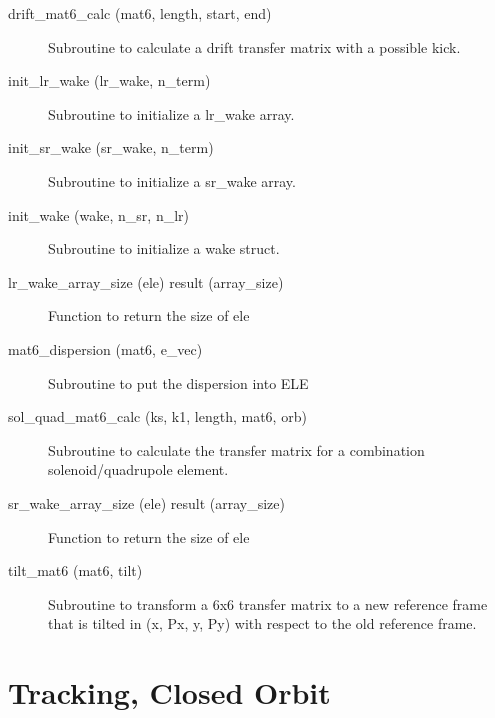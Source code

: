 \begin{description}

\item[drift\_mat6\_calc (mat6, length, start, end)] \Newline
Subroutine to calculate a drift transfer matrix with a possible kick. 

\item[init\_lr\_wake (lr\_wake, n\_term)] \Newline 
Subroutine to initialize a lr\_wake array.

\item[init\_sr\_wake (sr\_wake, n\_term)] \Newline 
Subroutine to initialize a sr\_wake array.

\item[init\_wake (wake, n\_sr, n\_lr)] \Newline 
Subroutine to initialize a wake struct.

\item[lr\_wake\_array\_size (ele) result (array\_size)] \Newline 
Function to return the size of ele%

\item[mat6\_dispersion (mat6, e\_vec)] \Newline
Subroutine to put the dispersion into ELE%

\item[sol\_quad\_mat6\_calc (ks, k1, length, mat6, orb)] \Newline
Subroutine to calculate the transfer matrix for a combination solenoid/quadrupole element. 

\item[sr\_wake\_array\_size (ele) result (array\_size)] \Newline 
Function to return the size of ele%

\item[tilt\_mat6 (mat6, tilt)] \Newline
Subroutine to transform a 6x6 transfer matrix to a new reference frame that is 
tilted in (x, Px, y, Py) with respect to the old reference frame. 

\end{description}

\section{Tracking, Closed Orbit}
\label{r:track}    

